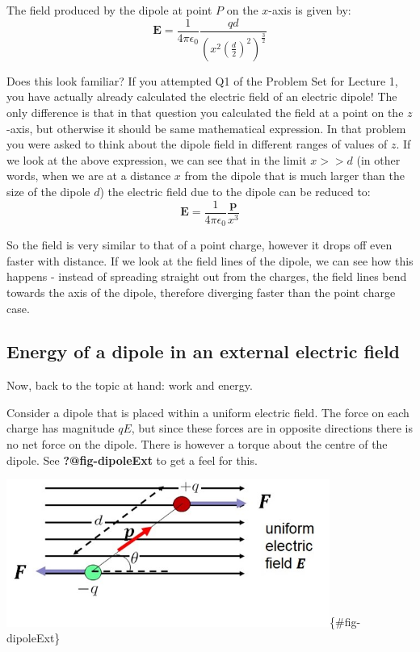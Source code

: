 \documentclass[
  letterpaper,
  DIV=11,
  numbers=noendperiod]{scrreprt}
\begin{document}
The field produced by the dipole at point \(P\) on the \(x\)-axis is
given by: \[
\mathrm{\mathbf{E}}= \frac{1}{4\pi \epsilon_0} \frac{qd}{ \left( x^2 \left( \frac{d}{2} \right)^2 \right)^{\frac{3}{2}} }
\]

Does this look familiar? If you attempted Q1 of the Problem Set for
Lecture 1, you have actually already calculated the electric field of an
electric dipole! The only difference is that in that question you
calculated the field at a point on the \(z\)-axis, but otherwise it
should be same mathematical expression. In that problem you were asked
to think about the dipole field in different ranges of values of \(z\).
If we look at the above expression, we can see that in the limit
\(x >> d\) (in other words, when we are at a distance \(x\) from the
dipole that is much larger than the size of the dipole \(d\)) the
electric field due to the dipole can be reduced to: \[
\mathrm{\mathbf{E}}= \frac{1}{4 \pi \epsilon_0} \frac{\mathrm{\mathbf{p}}}{x^3}
\]

So the field is very similar to that of a point charge, however it drops
off even faster with distance. If we look at the field lines of the
dipole, we can see how this happens - instead of spreading straight out
from the charges, the field lines bend towards the axis of the dipole,
therefore diverging faster than the point charge case.

\subsection{Energy of a dipole in an external electric
field}\label{energy-of-a-dipole-in-an-external-electric-field}

Now, back to the topic at hand: work and energy.

Consider a dipole that is placed within a uniform electric field. The
force on each charge has magnitude \(qE\), but since these forces are in
opposite directions there is no net force on the dipole. There is
however a torque about the centre of the dipole. See
\textbf{?@fig-dipoleExt} to get a feel for this.

\includegraphics[width=4.16667in,height=\textheight]{Figures/dipole_extE.jpg}\{\#fig-dipoleExt\}
\end{document}
